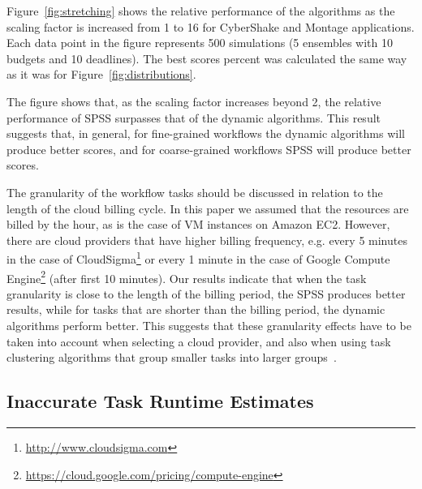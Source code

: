 \documentclass[preprint,5p]{elsarticle}
\begin{document}
Figure~\ref{fig:stretching} shows the relative performance of the algorithms as
the scaling factor is increased from 1 to 16 for CyberShake  and Montage
applications. Each data point in the figure represents 500 simulations (5
ensembles with 10 budgets and 10 deadlines). The best scores percent was
calculated the same way as it was for Figure~\ref{fig:distributions}.

The figure shows that, as the scaling factor increases beyond 2, the relative
performance of SPSS surpasses that of the dynamic algorithms.  This result
suggests that, in general, for fine-grained workflows the dynamic algorithms
will produce better scores, and for coarse-grained workflows SPSS will produce
better scores.

The granularity of the workflow tasks should be discussed in relation to the
length of the cloud billing cycle. In this paper we assumed that the resources
are billed by the hour, as is the case of VM instances on Amazon EC2.
However, there are cloud providers that have higher billing frequency, e.g.
every 5 minutes in the case of
CloudSigma\footnote{\url{http://www.cloudsigma.com}} or every 1 minute in the
case of Google Compute
Engine\footnote{\url{https://cloud.google.com/pricing/compute-engine}} (after
first 10 minutes). Our results indicate that when the task granularity is close
to the length of the billing period, the SPSS produces better results, while for
tasks that are shorter than the billing period, the dynamic algorithms perform
better. This suggests that these granularity effects have to be taken into account when
selecting a cloud provider, and also when using task clustering algorithms that
group smaller tasks into larger groups~\cite{ChenD12}.



\subsection{Inaccurate Task Runtime Estimates}
\label{sec:variances}
\end{document}
